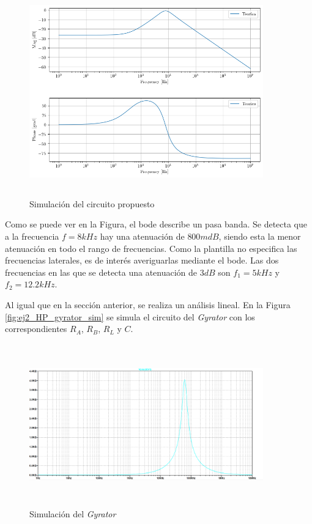 \begin{figure}[h!]                                                       
    \centering\includegraphics[width=0.9\textwidth, height=9cm]{../Ex2/Resources/ej2_bp_sim.png}
    \caption{Simulación del circuito propuesto }
    \label{ej2_bp_sim}
    \end{figure}

Como se puede ver en la Figura, el bode describe un pasa banda. Se detecta que a la frecuencia $f = 8kHz$ hay una atenuación de $800 mdB$, siendo esta la menor atenuación en todo el rango de frecuencias. Como la plantilla no especifica las frecuencias laterales, es de interés averiguarlas mediante el bode. Las dos frecuencias en las que se detecta una atenuación de $3 dB$ son $f_1 = 5kHz$ y $f_2 = 12.2kHz$. 


Al igual que en la sección anterior, se realiza un análisis lineal. En la Figura \ref{fig:ej2_HP_gyrator_sim} se simula el circuito del \textit{Gyrator} con los correspondientes  $R_A$, $R_B$,  $R_L$ y $C$.



\begin{figure}[h!]                                                       
    \centering\includegraphics[width=0.9\textwidth, height=7cm]{../Ex2/Resources/ej2_bp_gyrator_sim.png}
    \caption{Simulación del \textit{Gyrator} }
    \label{fig:ej2_BP_gyrator_sim}
    \end{figure}


